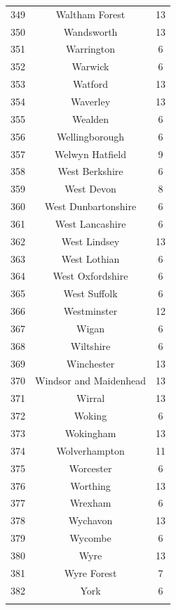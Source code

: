 \documentclass[Royal,times,sageh]{sagej}
\begin{document}
\begin{table}[!htbp]
\begin{tabular}{@{\extracolsep{5pt}} ccc}
349 & Waltham Forest & 13 \\ 
350 & Wandsworth & 13 \\ 
351 & Warrington & 6 \\ 
352 & Warwick & 6 \\ 
353 & Watford & 13 \\ 
354 & Waverley & 13 \\ 
355 & Wealden & 6 \\ 
356 & Wellingborough & 6 \\ 
357 & Welwyn Hatfield & 9 \\ 
358 & West Berkshire & 6 \\ 
359 & West Devon & 8 \\ 
360 & West Dunbartonshire & 6 \\ 
361 & West Lancashire & 6 \\ 
362 & West Lindsey & 13 \\ 
363 & West Lothian & 6 \\ 
364 & West Oxfordshire & 6 \\ 
365 & West Suffolk & 6 \\ 
366 & Westminster & 12 \\ 
367 & Wigan & 6 \\ 
368 & Wiltshire & 6 \\ 
369 & Winchester & 13 \\ 
370 & Windsor and Maidenhead & 13 \\ 
371 & Wirral & 13 \\ 
372 & Woking & 6 \\ 
373 & Wokingham & 13 \\ 
374 & Wolverhampton & 11 \\ 
375 & Worcester & 6 \\ 
376 & Worthing & 13 \\ 
377 & Wrexham & 6 \\ 
378 & Wychavon & 13 \\ 
379 & Wycombe & 6 \\ 
380 & Wyre & 13 \\ 
381 & Wyre Forest & 7 \\ 
382 & York & 6 \\ 
\hline \\[-1.8ex] 
\end{tabular} 
\end{table}
\end{document}

